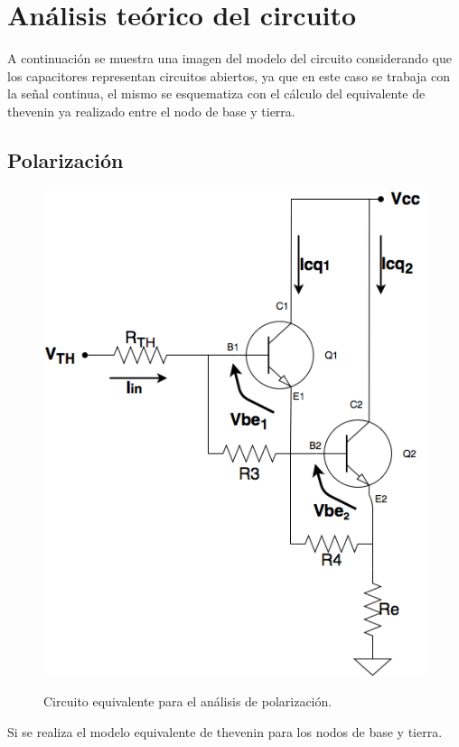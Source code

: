 \section{An\'alisis te\'orico del circuito}

A continuaci\'on se muestra una imagen del modelo del circuito considerando que los capacitores representan circuitos abiertos, ya que en este caso se trabaja con la señal continua, el mismo se esquematiza con el cálculo del equivalente de thevenin ya realizado entre el nodo de base y tierra.

	\subsection{Polarizaci\'on}
		
		\begin{figure}[H]
			\centering
			\includegraphics[scale=0.4]{./Imagenes/polarizacion.png} \\
			\caption{Circuito equivalente para el an\'alisis de polarizaci\'on.}
			\label{polarizacion}
		\end{figure}

Si se realiza el modelo equivalente de thevenin para los nodos de base y tierra.\\

